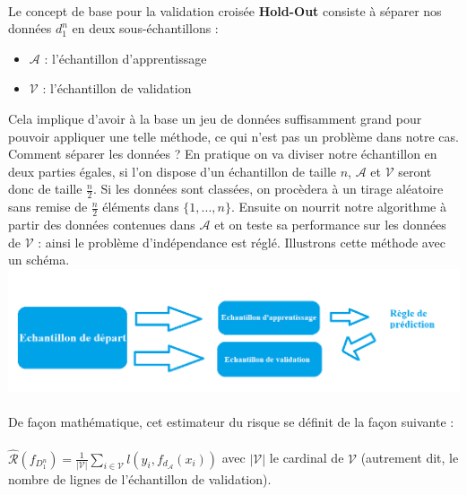 \documentclass[14pt, openany]{article}
\begin{document}
\paragraph{}
Le concept de base pour la validation croisée \textbf{Hold-Out} consiste à séparer nos données $d^{n}_{1}$ en deux sous-échantillons :
\begin{itemize}
\item $\mathcal{A}$ : l'échantillon d'apprentissage
\item $\mathcal{V}$ : l'échantillon de validation
\end{itemize}
\bigskip
Cela implique d'avoir à la base un jeu de données suffisamment \og grand \fg{} pour pouvoir appliquer une telle méthode, ce qui n'est pas un problème dans notre cas. Comment séparer les données ? En pratique on va diviser notre échantillon en deux parties égales, si l'on dispose d'un échantillon de taille $n$, $\mathcal{A}$ et $\mathcal{V}$ seront donc de taille $\frac{n}{2}$. Si les données sont classées, on procèdera à un tirage aléatoire sans remise de $\frac{n}{2}$ éléments dans $\{1,...,n\}$.
Ensuite on \og nourrit \fg{} notre algorithme à partir des données contenues dans $\mathcal{A}$ et on teste sa performance sur les données de $\mathcal{V}$ : ainsi le problème d'indépendance est réglé. Illustrons cette méthode avec un schéma.\\
\includegraphics[width=18cm]{Images/hold_out.png}
\begin{center}
\label{fig1}
\end{center}
\paragraph{}
De façon mathématique, cet estimateur du risque se définit de la façon suivante :
\paragraph{}
$\widehat{\mathcal{R}}(f_{D^{n}_{1}}) = \frac{1}{|\mathcal{V}|} \sum\limits_{i \in \mathcal{V}} l(y_i,f_{d_{\mathcal{A}}}(x_i))$ avec $|\mathcal{V}|$ le cardinal de $\mathcal{V}$ (autrement dit, le nombre de lignes de l'échantillon de validation).
\end{document}
